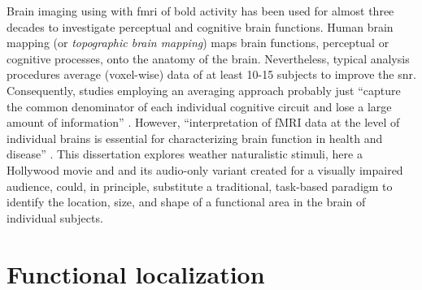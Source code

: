 

%
Brain imaging using with \ac{fmri} of \ac{bold} activity has been used for
almost three decades to investigate perceptual and cognitive brain functions.
%
Human brain mapping (or \textit{topographic brain mapping}) maps brain
functions, perceptual or cognitive processes, onto the anatomy of the brain.
%
Nevertheless, typical analysis procedures average (voxel-wise) data of at least
10-15 subjects to improve the \ac{snr}.
%
Consequently, studies employing an averaging approach probably just ``capture
the common denominator of each individual cognitive circuit and lose a large
amount of information'' \citep{pinel2007fast}.
%
However, ``interpretation of fMRI data at the level of individual brains is
essential for characterizing brain function in health and disease''
\citep{dubois2016building}.
%
This dissertation explores weather naturalistic stimuli, here a Hollywood movie
and and its audio-only variant created for a visually impaired audience, could,
in principle, substitute a traditional, task-based paradigm to identify the
location, size, and shape of a functional area in the brain of individual
subjects.


\section{Functional localization}





